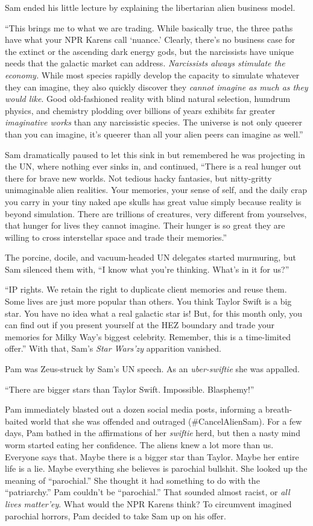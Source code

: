 Sam ended his little lecture by explaining the libertarian alien
business model.

``This brings me to what we are trading. While basically true, the three
paths have what your NPR Karens call `nuance.' Clearly, there's no
business case for the extinct or the ascending dark energy gods, but the
narcissists have unique needs that the galactic market can address.
\emph{Narcissists always stimulate the economy.} While most species
rapidly develop the capacity to simulate whatever they can imagine, they
also quickly discover they \emph{cannot imagine as much as they would
like}. Good old-fashioned reality with blind natural selection, humdrum
physics, and chemistry plodding over billions of years exhibits far
greater \emph{imaginative works} than any narcissistic species. The
universe is not only queerer than you can imagine, it's queerer than all
your alien peers can imagine as well.''

Sam dramatically paused to let this sink in but remembered he was
projecting in the UN, where nothing ever sinks in, and continued,
``There is a real hunger out there for brave new worlds. Not tedious
hacky fantasies, but nitty-gritty unimaginable alien realities. Your
memories, your sense of self, and the daily crap you carry in your tiny
naked ape skulls has great value simply because reality is beyond
simulation. There are trillions of creatures, very different from
yourselves, that hunger for lives they cannot imagine. Their hunger is
so great they are willing to cross interstellar space and trade their
memories.''

The porcine, docile, and vacuum-headed UN delegates started murmuring,
but Sam silenced them with, ``I know what you're thinking. What's in it
for us?''

``IP rights. We retain the right to duplicate client memories and reuse
them. Some lives are just more popular than others. You think Taylor
Swift is a big star. You have no idea what a real galactic star is! But,
for this month only, you can find out if you present yourself at the HEZ
boundary and trade your memories for Milky Way's biggest celebrity.
Remember, this is a time-limited offer.'' With that, Sam's \emph{Star
Wars'zy} apparition vanished.

Pam was Zeus-struck by Sam's UN speech. As an
\emph{uber-swiftie} she was appalled.

``There are bigger stars than Taylor Swift. Impossible. Blasphemy!''

Pam immediately blasted out a dozen social media posts, informing a
breath-baited world that she was offended and outraged
(\#CancelAlienSam). For a few days, Pam bathed in the affirmations of
her \emph{swiftie} herd, but then a nasty mind worm started eating her
confidence. The aliens knew a lot more than us. Everyone says that.
Maybe there is a bigger star than Taylor. Maybe her entire life is a
lie. Maybe everything she believes is parochial bullshit. She looked up
the meaning of ``parochial.'' She thought it had something to do with
the ``patriarchy.'' Pam couldn't be ``parochial.'' That sounded almost
racist, or \emph{all lives matter'ey}. What would the NPR Karens think?
To circumvent imagined parochial horrors, Pam decided to take Sam up on
his offer.

